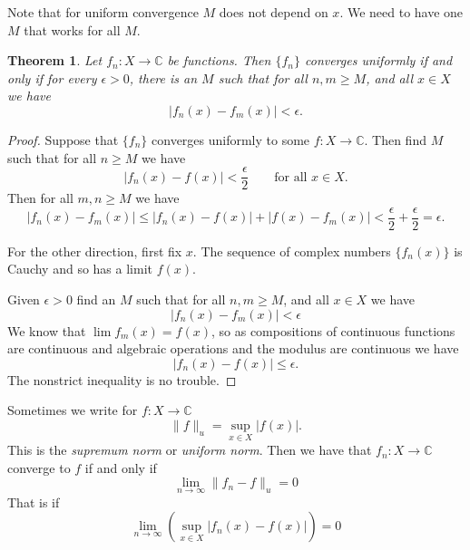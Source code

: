 \documentclass[12pt]{book}
\newcommand{\snorm}[1]{\lVert {#1} \rVert}
\newcommand{\abs}[1]{\left\lvert {#1} \right\rvert}
\newcommand{\C}{{\mathbb{C}}}
\newcommand{\myindex}[1]{#1\index{#1}}
\theoremstyle{plain}
\newtheorem{thm}{Theorem}[section]
\theoremstyle{remark}
\theoremstyle{definition}
\theoremstyle{exercise}
\theoremstyle{example}
\begin{document}
Note that for uniform convergence $M$ does not depend on $x$.  We need to
have one $M$ that works for all $M$.

\begin{thm}
Let $f_n \colon X \to \C$ be functions.  Then $\{ f_n \}$ converges
uniformly if and only if for every $\epsilon > 0$, there is an $M$ such that
for all $n, m \geq M$, and all $x \in X$ we have
\begin{equation*}
\abs{f_n(x)-f_m(x)} < \epsilon .
\end{equation*}
\end{thm}

\begin{proof}
Suppose that $\{f_n\}$ converges uniformly to some $f \colon X \to \C$.  Then 
find $M$ such that for all $n \geq M$ we have
\begin{equation*}
\abs{f_n(x)-f(x)} < \frac{\epsilon}{2} \qquad \text{for all $x \in X$.}
\end{equation*}
Then for all $m,n \geq M$ we have
\begin{equation*}
\abs{f_n(x)-f_m(x)}
\leq
\abs{f_n(x)-f(x)} + \abs{f(x)-f_m(x)} < \frac{\epsilon}{2} + \frac{\epsilon}{2}
= \epsilon .
\end{equation*}

For the other direction, first fix $x$.
The sequence
of complex numbers $\{ f_n(x) \}$ is Cauchy and so has a limit
$f(x)$.

Given $\epsilon > 0$ find an $M$ such that
for all $n, m \geq M$, and all $x \in X$ we have
\begin{equation*}
\abs{f_n(x)-f_m(x)} < \epsilon
\end{equation*}
We know that $\lim f_m(x) = f(x)$, so
as compositions of continuous functions are continuous
and algebraic operations and the modulus are continuous we have
\begin{equation*}
\abs{f_n(x)-f(x)} \leq \epsilon .
\end{equation*}
The nonstrict inequality is no trouble.
\end{proof}

Sometimes we write for $f \colon X \to \C$
\begin{equation*}
\snorm{f}_u = \sup_{x \in X} \abs{f(x)} .
\end{equation*}
This is the \emph{\myindex{supremum norm}} or \emph{\myindex{uniform norm}}.
Then we have that
$f_n \colon X \to \C$ converge to $f$ if and only if
\begin{equation*}
\lim_{n\to \infty} \snorm{f_n-f}_u = 0
\end{equation*}
That is if
\begin{equation*}
\lim_{n\to \infty} \left( \sup_{x \in X} \abs{f_n(x)-f(x)} \right) = 0
\end{equation*}
\end{document}
